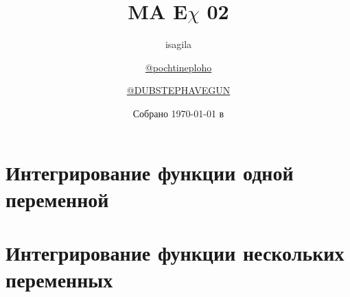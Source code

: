 \documentclass[a4paper]{article}
\title{\huge \textbf{MA E\(\chi\) 02}}
\author{
  isagila
  \and
  \href{https://t.me/pochtineploho}{@pochtineploho}
  \and
  \href{https://t.me/DUBSTEPHAVEGUN}{@DUBSTEPHAVEGUN}
}
\date{Собрано {\ddmmyyyydate\today} в \currenttime}
\begin{document}
\setlength{\abovedisplayskip}{-5pt}
\setlength{\abovedisplayshortskip}{0pt}
\setlength{\belowdisplayskip}{0pt}
\setlength{\belowdisplayshortskip}{0pt}

\clearpage
\maketitle
\thispagestyle{mainpage}
\newpage
\setcounter{page}{2}
\tableofcontents

\newpage
\section{Интегрирование функции одной переменной}

\begin{questions}
  
  
  
  
  
  
  
  
  
  
  
  
  
  
  
  
  
  
  
  
  
  
  
  
\end{questions}

\newpage
\section{Интегрирование функции нескольких переменных}

\begin{questions}
  
  
  
  
  
  
  
  
  
  
  
  
  
  
  
  
  
  
  
  
  
  
  
\end{questions}
\end{document}
